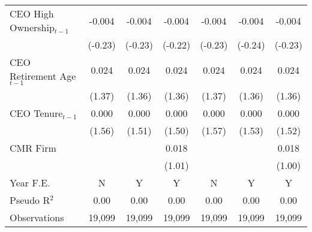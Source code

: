 {\begin{tabular}{l*{6}{c}}
CEO High Ownership$ _{t-1} $&   -0.004         &   -0.004         &   -0.004         &   -0.004         &   -0.004         &   -0.004         \\
          &  (-0.23)         &  (-0.23)         &  (-0.22)         &  (-0.23)         &  (-0.24)         &  (-0.23)         \\
CEO Retirement Age$ _{t-1} $&    0.024         &    0.024         &    0.024         &    0.024         &    0.024         &    0.024         \\
          &   (1.37)         &   (1.36)         &   (1.36)         &   (1.37)         &   (1.36)         &   (1.36)         \\
CEO Tenure$ _{t-1} $&    0.000         &    0.000         &    0.000         &    0.000         &    0.000         &    0.000         \\
          &   (1.56)         &   (1.51)         &   (1.50)         &   (1.57)         &   (1.53)         &   (1.52)         \\
CMR Firm  &                  &                  &    0.018         &                  &                  &    0.018         \\
          &                  &                  &   (1.01)         &                  &                  &   (1.00)         \\
\midrule Year F.E. &        N         &        Y         &        Y         &        N         &        Y         &        Y         \\

Pseudo R$ ^2$&     0.00         &     0.00         &     0.00         &     0.00         &     0.00         &     0.00         \\
Observations&   19,099         &   19,099         &   19,099         &   19,099         &   19,099         &   19,099         \\
\bottomrule
\end{tabular}
}
